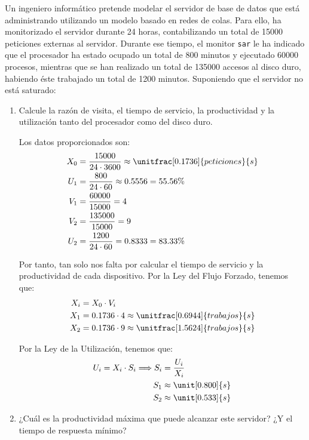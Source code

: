 \begin{ejercicio}\label{ej:5.28}
    Un ingeniero informático pretende modelar el servidor de base de datos que está administrando utilizando un modelo basado en redes de colas. Para ello, ha monitorizado el servidor durante 24 horas, contabilizando un total de 15000 peticiones externas al servidor. Durante ese tiempo, el monitor \verb|sar| le ha indicado que el procesador ha estado ocupado un total de 800 minutos y ejecutado 60000 procesos, mientras que se han realizado un total de 135000 accesos al disco duro, habiendo éste trabajado un total de 1200 minutos. Suponiendo que el servidor no está saturado:
    \begin{enumerate}
        \item Calcule la razón de visita, el tiempo de servicio, la productividad y la utilización tanto del procesador como del disco duro.
        
        Los datos proporcionados son:
        \begin{align*}
            X_0 &= \dfrac{15000}{24 \cdot 3600} \approx \unitfrac[0.1736]{peticiones}{s}\\
            U_1 &= \dfrac{800}{24 \cdot 60} \approx 0.5556 = 55.56\%\\
            V_1 &= \dfrac{60000}{15000} = 4 \\
            V_2 &= \dfrac{135000}{15000} = 9 \\
            U_2 &= \dfrac{1200}{24 \cdot 60} = 0.8333 = 83.33\%
        \end{align*}

        Por tanto, tan solo nos falta por calcular el tiempo de servicio y la productividad de cada dispositivo.
        Por la Ley del Flujo Forzado, tenemos que:
        \begin{align*}
            X_i &= X_0 \cdot V_i\\
            X_1 &= 0.1736 \cdot 4 \approx \unitfrac[0.6944]{trabajos}{s} \\
            X_2 &= 0.1736 \cdot 9 \approx \unitfrac[1.5624]{trabajos}{s}
        \end{align*}

        Por la Ley de la Utilización, tenemos que:
        \begin{align*}
            U_i = X_i \cdot S_i
            \Longrightarrow S_i &= \dfrac{U_i}{X_i}\\
            S_1 &\approx \unit[0.800]{s} \\
            S_2 &\approx \unit[0.533]{s}
        \end{align*}
        \item ¿Cuál es la productividad máxima que puede alcanzar este servidor? ¿Y el tiempo de respuesta mínimo?
        

\end{enumerate}
\end{ejercicio}
